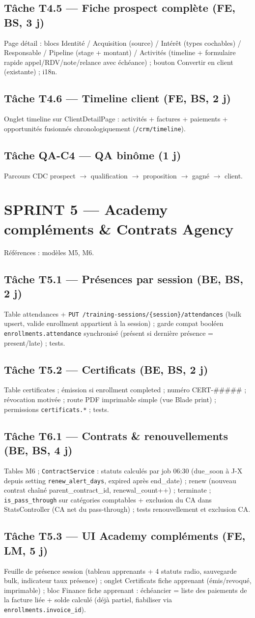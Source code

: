 \documentclass[11pt,a4paper]{article}
\newcommand{\tache}[2]{\subsection{Tâche #1 --- #2}\label{task:#1}}
\begin{document}
\tache{T4.5}{Fiche prospect complète (FE, BS, 3 j)} Page détail : blocs Identité / Acquisition (source) / Intérêt (types cochables) / Responsable / Pipeline (stage + montant) / Activités (timeline + formulaire rapide appel/RDV/note/relance avec échéance) ; bouton Convertir en client (existante) ; i18n.

\tache{T4.6}{Timeline client (FE, BS, 2 j)} Onglet timeline sur ClientDetailPage : activités + factures + paiements + opportunités fusionnés chronologiquement (\verb|/crm/timeline|).

\tache{QA-C4}{QA binôme (1 j)} Parcours CDC prospect $\rightarrow$ qualification $\rightarrow$ proposition $\rightarrow$ gagné $\rightarrow$ client.

\section{SPRINT 5 --- Academy compléments \& Contrats Agency}

Références : modèles M5, M6.

\tache{T5.1}{Présences par session (BE, BS, 2 j)} Table attendances + \verb|PUT /training-sessions/{session}/attendances| (bulk upsert, valide enrollment appartient à la session) ; garde compat booléen \verb|enrollments.attendance| synchronisé (présent si dernière présence = present/late) ; tests.

\tache{T5.2}{Certificats (BE, BS, 2 j)} Table certificates ; émission si enrollment completed ; numéro CERT-##### ; révocation motivée ; route PDF imprimable simple (vue Blade print) ; permissions \verb|certificats.*| ; tests.

\tache{T6.1}{Contrats \& renouvellements (BE, BS, 4 j)} Tables M6 ; \verb|ContractService| : statuts calculés par job 06:30 (due\_soon à J-X depuis setting \verb|renew_alert_days|, expired après end\_date) ; renew (nouveau contrat chaîné parent\_contract\_id, renewal\_count++) ; terminate ; \verb|is_pass_through| sur catégories comptables + exclusion du CA dans StatsController (CA net du pass-through) ; tests renouvellement et exclusion CA.

\tache{T5.3}{UI Academy compléments (FE, LM, 5 j)} Feuille de présence session (tableau apprenants + 4 statuts radio, sauvegarde bulk, indicateur taux présence) ; onglet Certificats fiche apprenant (émis/revoqué, imprimable) ; bloc Finance fiche apprenant : échéancier = liste des paiements de la facture liée + solde calculé (déjà partiel, fiabiliser via \verb|enrollments.invoice_id|).
\end{document}
